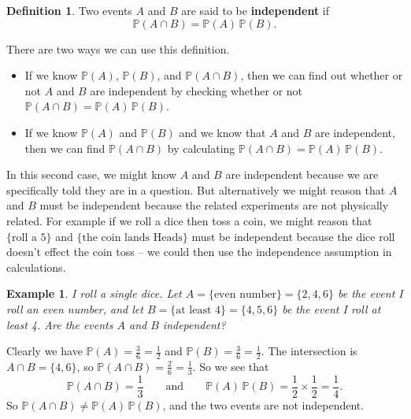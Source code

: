 \documentclass[
  a4paper,
]{book}
\providecommand{\tightlist}{%
  \setlength{\itemsep}{0pt}\setlength{\parskip}{0pt}}
\theoremstyle{definition}
\newtheorem{definition}{Definition}[chapter]
\theoremstyle{definition}
\newtheorem{example}{Example}[chapter]
\theoremstyle{definition}
\theoremstyle{definition}
\theoremstyle{remark}
\begin{document}
\begin{definition}
Two events \(A\) and \(B\) are said to be \textbf{independent} if
\[ \mathbb P(A \cap B) = \mathbb P(A)\, \mathbb P(B) .  \]
\end{definition}

There are two ways we can use this definition.

\begin{itemize}
\tightlist
\item
  If we know \(\mathbb P(A)\), \(\mathbb P(B)\), and \(\mathbb P(A \cap B)\), then we can find out whether or not \(A\) and \(B\) are independent by checking whether or not \(\mathbb P(A \cap B) = \mathbb P(A)\, \mathbb P(B)\).
\item
  If we know \(\mathbb P(A)\) and \(\mathbb P(B)\) and we know that \(A\) and \(B\) are independent, then we can find \(\mathbb P(A \cap B)\) by calculating \(\mathbb P(A \cap B) = \mathbb P(A)\, \mathbb P(B)\).
\end{itemize}

In this second case, we might know \(A\) and \(B\) are independent because we are specifically told they are in a question. But alternatively we might reason that \(A\) and \(B\) must be independent because the related experiments are not physically related. For example if we roll a dice then toss a coin, we might reason that \(\{\text{roll a 5}\}\) and \(\{\text{the coin lands Heads}\}\) must be independent because the dice roll doesn't effect the coin toss -- we could then use the independence assumption in calculations.

\begin{example}
\emph{I roll a single dice. Let \(A = \{\text{even number}\} = \{2,4,6\}\) be the event I roll an even number, and let \(B = \{\text{at least 4}\} = \{4,5,6\}\) be the event I roll at least 4. Are the events \(A\) and \(B\) independent?}

Clearly we have \(\mathbb P(A) = \frac36 = \frac12\) and \(\mathbb P(B) = \frac 36 = \frac12\). The intersection is \(A \cap B = \{4,6\}\), so \(\mathbb P(A \cap B) = \frac26 = \frac13\). So we see that
\[ \mathbb P(A\cap B) = \frac13  \qquad \text{and} \qquad  \mathbb P(A)\, \mathbb P(B) = \frac12 \times \frac12 = \frac14 . \]
So \(\mathbb P(A \cap B) \neq \mathbb P(A)\, \mathbb P(B)\), and the two events are not independent.
\end{example}
\end{document}
